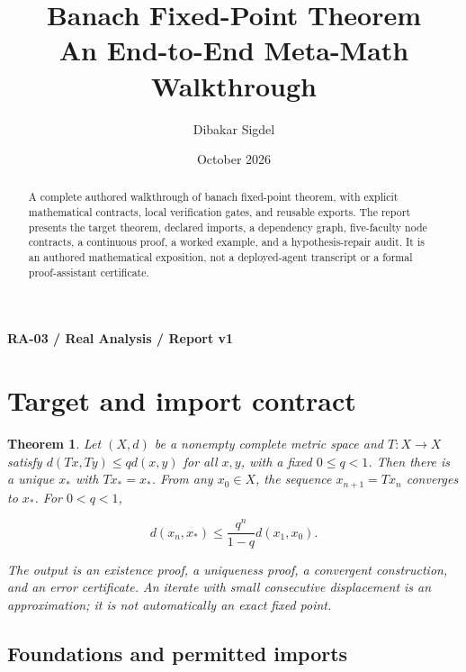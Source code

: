 \documentclass[preprint,12pt,aps,pra,showkeys,amsmath,amssymb,superscriptaddress,floatfix]{revtex4-2}
\newtheorem{theorem}{Theorem}[section]
\theoremstyle{definition}
\theoremstyle{remark}
\begin{document}
\title{Banach Fixed-Point Theorem\\[4pt]\large An End-to-End Meta-Math Walkthrough}

\author{Dibakar Sigdel}


\date{October 2026}

\begin{abstract}

A complete authored walkthrough of banach fixed-point theorem, with
explicit mathematical contracts, local verification gates, and reusable
exports. The report presents the target theorem, declared imports, a
dependency graph, five-faculty node contracts, a continuous proof, a
worked example, and a hypothesis-repair audit. It is an authored
mathematical exposition, not a deployed-agent transcript or a formal
proof-assistant certificate.

\end{abstract}\maketitle\linespread{1.12}\selectfont

\noindent\textbf{RA-03 / Real Analysis / Report v1}

\section{Target and import contract}

\begin{theorem}

Let \((X,d)\) be a nonempty complete metric space and \(T:X\to X\)
satisfy \(d(Tx,Ty)\le qd(x,y)\) for all \(x,y\), with a fixed
\(0\le q<1\). Then there is a unique \(x_*\) with \(Tx_*=x_*\). From any
\(x_0\in X\), the sequence \(x_{n+1}=Tx_n\) converges to \(x_*\). For
\(0<q<1\),

\[d(x_n,x_*)\le\frac{q^n}{1-q}d(x_1,x_0).\]

The output is an existence proof, a uniqueness proof, a convergent
construction, and an error certificate. An iterate with small
consecutive displacement is an approximation; it is not automatically an
exact fixed point.

\end{theorem}

\subsection{Foundations and permitted imports}
\end{document}
